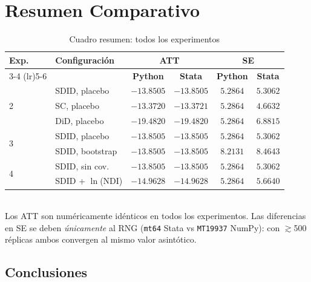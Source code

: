 \documentclass[11pt, a4paper]{article}
\newcommand{\py}{\textcolor{pyblue}{\textbf{Python}}}
\newcommand{\st}{\textcolor{stgreen}{\textbf{Stata}}}
\begin{document}
\section{Resumen Comparativo}

\begin{table}[H]
\centering
\caption{Cuadro resumen: todos los experimentos}
\setlength{\tabcolsep}{4pt}
\begin{tabular}{llcccc}
\toprule
\textbf{Exp.} & \textbf{Configuración} & \multicolumn{2}{c}{\textbf{ATT}} & \multicolumn{2}{c}{\textbf{SE}} \\
\cmidrule(lr){3-4} \cmidrule(lr){5-6}
& & \py{} & \st{} & \py{} & \st{} \\
\midrule
\multirow{3}{*}{2}
  & SDID, placebo & $-13.8505$ & $-13.8505$ & $5.2864$ & $5.3062$ \\
  & SC, placebo   & $-13.3720$ & $-13.3721$ & $5.2864$ & $4.6632$ \\
  & DiD, placebo  & $-19.4820$ & $-19.4820$ & $5.2864$ & $6.8815$ \\
\midrule
\multirow{2}{*}{3}
  & SDID, placebo   & $-13.8505$ & $-13.8505$ & $5.2864$ & $5.3062$ \\
  & SDID, bootstrap & $-13.8505$ & $-13.8505$ & $8.2131$ & $8.4643$ \\
\midrule
\multirow{2}{*}{4}
  & SDID, sin cov.      & $-13.8505$ & $-13.8505$ & $5.2864$ & $5.3062$ \\
  & SDID + $\ln$(NDI)   & $-14.9628$ & $-14.9628$ & $5.2864$ & $5.6640$ \\
\bottomrule
\end{tabular}\\[0.4em]
{\small Los ATT son numéricamente idénticos en todos los experimentos. Las diferencias en SE se deben \textit{únicamente} al RNG (\texttt{mt64} Stata vs \texttt{MT19937} NumPy): con $\gtrsim$500 réplicas ambos convergen al mismo valor asintótico.}
\end{table}

\subsection*{Conclusiones}
\end{document}
